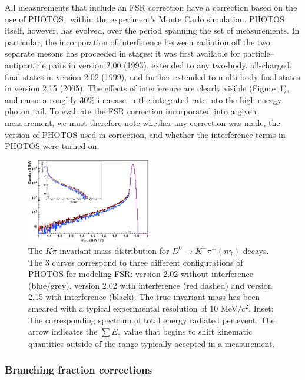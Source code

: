 All measurements that include an FSR correction 
have a correction based on the use of 
PHOTOS~\cite{Barberio:1990ms,Barberio:1993qi,Golonka:2005pn,Golonka:2006tw} 
within the experiment's Monte Carlo simulation.  
PHOTOS itself, however, has evolved, over the period spanning the set of
measurements.  In particular, the incorporation of interference between
radiation off %
the two separate mesons has proceeded in stages: it was first
available for particle--antiparticle pairs in version 2.00 (1993), extended 
to any two-body, all-charged, final states in version 2.02 (1999), and 
further extended to multi-body final states in version 2.15 (2005).
The effects of interference are clearly visible 
(Figure~\ref{fig:FSR_mass_shift}), and cause a 
roughly 30\% increase in the integrated rate into 
the high energy photon tail.  To evaluate the FSR 
correction incorporated into a given measurement, 
we must therefore note whether any correction was 
made, the version of PHOTOS used in correction, 
and whether the interference terms in PHOTOS were 
turned on.  
\begin{figure}[bh]
\begin{center}
\includegraphics[width=0.48\textwidth,angle=0.]{figures/charm/FSR_mkpi.pdf}
\caption{The $K\pi$ invariant mass distribution for 
$D^0\to K^-\pi^+ (n\gamma)$ decays. The 3 curves correspond 
to three different configurations of PHOTOS for modeling FSR: 
version 2.02 without interference (blue/grey), version 2.02 with 
interference (red dashed) and version 2.15 with interference (black).  
The true invariant mass has been smeared with a typical experimental 
resolution of 10 MeV${}/c^2$.  Inset: The corresponding spectrum of 
total energy radiated per event.  The arrow indicates the $\sum E_\gamma$ 
value that begins to shift kinematic quantities outside of the range 
typically accepted in a measurement.}
\label{fig:FSR_mass_shift}
\end{center}
\end{figure}


\subsubsection{Branching fraction corrections}


